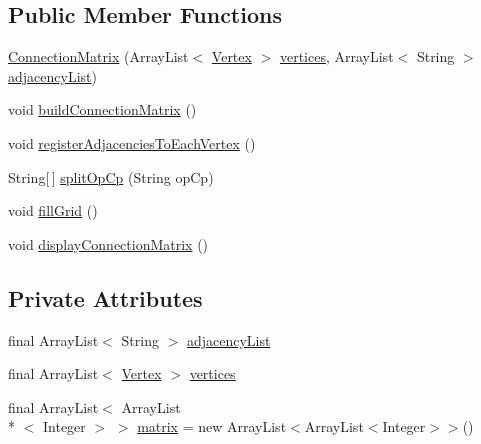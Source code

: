 \subsection*{Public Member Functions}
\begin{DoxyCompactItemize}
\item 
\hyperlink{classmain_1_1java_1_1com_1_1company_1_1dijkstratest_1_1_connection_matrix_abf29234358773911d627a62f49502e95}{Connection\-Matrix} (Array\-List$<$ \hyperlink{classmain_1_1java_1_1com_1_1company_1_1dijkstratest_1_1_vertex}{Vertex} $>$ \hyperlink{classmain_1_1java_1_1com_1_1company_1_1dijkstratest_1_1_connection_matrix_a372aa9baecc703f490a3eef8845bc7a7}{vertices}, Array\-List$<$ String $>$ \hyperlink{classmain_1_1java_1_1com_1_1company_1_1dijkstratest_1_1_connection_matrix_a0fcd8b3828105bd570fd97dca77db1ea}{adjacency\-List})
\item 
void \hyperlink{classmain_1_1java_1_1com_1_1company_1_1dijkstratest_1_1_connection_matrix_a883880082124638cae78f50746006e5b}{build\-Connection\-Matrix} ()
\item 
void \hyperlink{classmain_1_1java_1_1com_1_1company_1_1dijkstratest_1_1_connection_matrix_ade4179ca5619dadb5a2bbadab52ac93e}{register\-Adjacencies\-To\-Each\-Vertex} ()
\item 
String\mbox{[}$\,$\mbox{]} \hyperlink{classmain_1_1java_1_1com_1_1company_1_1dijkstratest_1_1_connection_matrix_a40c35866fd543064f675971e91a88a75}{split\-Op\-Cp} (String op\-Cp)
\item 
void \hyperlink{classmain_1_1java_1_1com_1_1company_1_1dijkstratest_1_1_connection_matrix_ab761efa04c328a3362d653a6612dd404}{fill\-Grid} ()
\item 
void \hyperlink{classmain_1_1java_1_1com_1_1company_1_1dijkstratest_1_1_connection_matrix_ad305dcd4ab25d7628dd843451e1856be}{display\-Connection\-Matrix} ()
\end{DoxyCompactItemize}
\subsection*{Private Attributes}
\begin{DoxyCompactItemize}
\item 
final Array\-List$<$ String $>$ \hyperlink{classmain_1_1java_1_1com_1_1company_1_1dijkstratest_1_1_connection_matrix_a0fcd8b3828105bd570fd97dca77db1ea}{adjacency\-List}
\item 
final Array\-List$<$ \hyperlink{classmain_1_1java_1_1com_1_1company_1_1dijkstratest_1_1_vertex}{Vertex} $>$ \hyperlink{classmain_1_1java_1_1com_1_1company_1_1dijkstratest_1_1_connection_matrix_a372aa9baecc703f490a3eef8845bc7a7}{vertices}
\item 
final Array\-List$<$ Array\-List\\*
$<$ Integer $>$ $>$ \hyperlink{classmain_1_1java_1_1com_1_1company_1_1dijkstratest_1_1_connection_matrix_a3c077791f0b8164d8c19f67d250f43fd}{matrix} = new Array\-List$<$Array\-List$<$Integer$>$$>$()
\end{DoxyCompactItemize}


